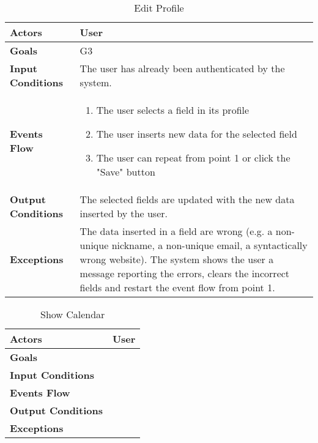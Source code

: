 \begin{table}[H]
	\centering
	\def\arraystretch{1.5}
	\begin{tabular}{|p{7cm}|p{7cm}|}
		\hline
		\textbf{Actors}            & User		    \\ \hline
		\textbf{Goals}             & G3           \\ \hline
		\textbf{Input Conditions}  & The user has already been authenticated by the system.           \\ \hline
		\textbf{Events Flow}       & 
			\begin{enumerate}[topsep=0pt, leftmargin=*]
				\item The user selects a field in its profile
				\item The user inserts new data for the selected field
				\item The user can repeat from point 1 or click the "Save" button
			\end{enumerate}           \\ \hline
		\textbf{Output Conditions} & The selected fields are updated with the new data inserted by the user.          \\ \hline
		\textbf{Exceptions}        &  The data inserted in a field are wrong (e.g. a non-unique nickname, a non-unique email, a syntactically wrong website). The system shows the user a message reporting the errors, clears the incorrect fields and restart the event flow from point 1.               \\ \hline
	\end{tabular}
	\caption{Edit Profile}
\end{table}

\begin{table}[H]
	\centering
	\def\arraystretch{1.5}
	\begin{tabular}{|p{7cm}|p{7cm}|}
		\hline
		\textbf{Actors}            & User		    \\ \hline
		\textbf{Goals}             &            \\ \hline
		\textbf{Input Conditions}  &            \\ \hline
		\textbf{Events Flow}       &            \\ \hline
		\textbf{Output Conditions} &            \\ \hline
		\textbf{Exceptions}        &            \\ \hline
	\end{tabular}
	\caption{Show Calendar}
\end{table}

